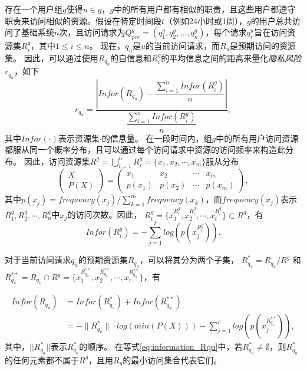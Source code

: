 存在一个用户组$g$使得$u \in g$，$g$中的所有用户都有相似的职责，且这些用户都遵守职责来访问相似的资源。假设在特定时间段$t$（例如24小时或1周），$g$的用户总共访问了基础系统$n$次，且访问请求为$Q^g_{pre}=(q^g_1,q^g_2,...,q^g_n)$，每个请求$q^u_i$旨在访问资源集$R^g_i$，其中$1 \leq i \leq n$。
现在，$q_u$是$u$的当前访问请求，而$R_u$是预期访问的资源集。 因此，可以通过使用$R_{q_u}$的自信息和$R^g_i$的平均信息之间的距离来量化\emph{隐私风险} $r_{q_u}$，如下
\begin{equation}\label{eq:privacy_risk_qu}
r_{q_u} = \dfrac{|Infor(R_{q_u})-\dfrac{\sum ^{n}_{i=1} Infor(R^g_i)}{n}|}{\dfrac{\sum ^{n}_{i=1} Infor(R^g_i)}{n}}, 
\end{equation}
其中$Infor(\cdot)$表示资源集$\cdot$的信息量。 在一段时间内，组$g$中的所有用户访问资源都服从同一个概率分布，且可以通过每个访问请求中资源的访问频率来构造此分布。 因此，访问资源集$R^g = \bigcup _{i=1}^n R^g_i=\{x_1, x_2, \cdots, x_m\}$服从分布
\begin{equation}\label{eq:distribution_Rg}
\left(
\begin{array}{c}
X \\ P(X)
\end{array}
\right)
=\left(
\begin{array}{cccccccccc}
x_1 &  x_2 & \cdots & x_m
\\ p(x_1) &  p(x_2) & \cdots & p(x_m)
\end{array}
\right),
\end{equation}
其中$p(x_j)=frequency(x_j)/\sum_{k=1}^m frequency(x_k)$，而$frequency(x_j)$表示$R^g_1, R^g_2, \cdots, R^g_n$中$x_j$的访问次数。因此， $R^g_i =\{x_1^{R^g_i},x_2^{R^g_i},\cdots, x_t^{R^g_i}\} \subset R^g$，有
\begin{equation}\label{eq:information_Rgi}
Infor(R^g_i)=-\sum_{j=1}^t log(p(x_j^{R^g_i})).
\end{equation}

对于当前访问请求$q_u$的预期资源集$R_{q_u}$，可以将其分为两个子集， $R_{q_u}^* = R_{q_u}/R^g$ 和 $R_{q_u}^{**} = R_{q_u} \cap R^g = \{x_1^{R_{q_u}^{**}},x_2^{R_{q_u}^{**}},\cdots, x_r^{R_{q_u}^{**}}\}$，有

\begin{equation}\label{eq:information_Rqu}
\begin{split}
Infor(R_{q_u})&=Infor(R_{q_u}^{*})  +Infor(R_{q_u}^{**})
\\&=-\|R_{q_u}^*\|\cdot log(min(P(X)))-\sum_{j=1}^r log(p(x_j^{R_{q_u}^{**}})),
\end{split}
\end{equation}
其中，$||R_{q_u}^*||$表示$R_{q_u}^*$的顺序。 在等式\ref{eq:information_Rqu}中，若$R_{q_u}^* \neq \emptyset$，则$R_{q_u}^*$的任何元素都不属于$R^g$，且用$R_g$的最小访问集合代表它们。

